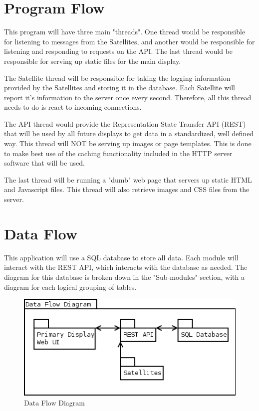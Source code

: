 \section{Program Flow}

This program will have three main "threads". One thread would be responsible for listening to messages from the Satellites, and another would be responsible for listening and responding to requests on the API. The last thread would be responsible for serving up static files for the main display.

The Satellite thread will be responsible for taking the logging information provided by the Satellites and storing it in the database. Each Satellite will report it's information to the server once every second. Therefore, all this thread needs to do is react to incoming connections.

The API thread would provide the Representation State Transfer API (REST) that will be used by all future displays to get data in a standardized, well defined way. This thread will NOT be serving up images or page templates. This is done to make best use of the caching functionality included in the HTTP server software that will be used.

The last thread will be running a "dumb" web page that servers up static HTML and Javascript files. This thread will also retrieve images and CSS files from the server.

\section{Data Flow}

This application will use a SQL database to store all data. Each module will interact with the REST API, which interacts with the database as needed. The diagram for this database is broken down in the "Sub-modules" section, with a diagram for each logical grouping of tables.

\begin{figure}[H]
\centering
\includegraphics[scale=0.75]{Software/images/DataFlowDiagram.png}
\caption{Data Flow Diagram}
\label{img:S_DataFlowDiagram}
\end{figure}

